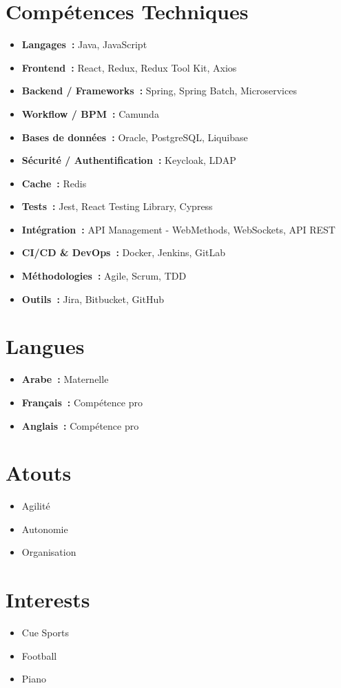 \section*{Compétences Techniques}

\begin{itemize}
    \item \textbf{Langages~:} Java, JavaScript
    \item \textbf{Frontend~:} React, Redux, Redux Tool Kit, Axios
    \item \textbf{Backend / Frameworks~:} Spring, Spring Batch, Microservices
    \item \textbf{Workflow / BPM~:} Camunda
    \item \textbf{Bases de données~:} Oracle, PostgreSQL, Liquibase
    \item \textbf{Sécurité / Authentification~:} Keycloak, LDAP
    \item \textbf{Cache~:} Redis
    \item \textbf{Tests~:} Jest, React Testing Library, Cypress
    \item \textbf{Intégration~:} API Management - WebMethods, WebSockets, API REST
    \item \textbf{CI/CD \& DevOps~:} Docker, Jenkins, GitLab
    \item \textbf{Méthodologies~:} Agile, Scrum, TDD
    \item \textbf{Outils~:} Jira, Bitbucket, GitHub
\end{itemize}

\section*{Langues}

\begin{itemize}
    \item \textbf{Arabe~:} Maternelle
    \item \textbf{Français~:} Compétence pro
    \item \textbf{Anglais~:} Compétence pro
\end{itemize}

\section*{Atouts}

\begin{itemize}
    \item Agilité
    \item Autonomie
    \item Organisation
\end{itemize}

\section*{Interests}

\begin{itemize}
    \item Cue Sports
    \item Football
    \item Piano
\end{itemize}
